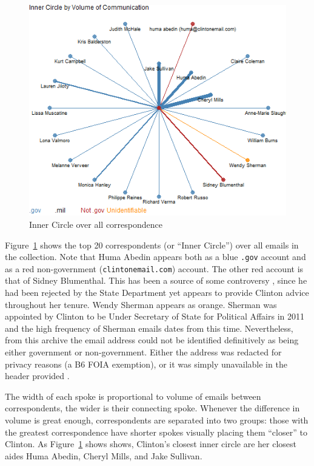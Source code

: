 \documentclass[journal]{vgtc}                %
\begin{document}
\begin{figure}[h]
\begin{center}
\includegraphics[width=0.95\linewidth]{SpiralNetworkFullTime}
\caption{Inner Circle over all correspondence}
\label{fig:InnerCircleAll}
\end{center}
\end{figure}
Figure~\ref{fig:InnerCircleAll} shows the top 20 correspondents (or ``Inner Circle'')  over all emails in the collection.
Note that Huma Abedin appears both as a blue  \texttt{.gov} account and as a red non-government (\texttt{clintonemail.com}) account.   The other red account is that of Sidney Blumenthal.  This has been a source of some controversy  \cite{BlumenthalControversy, NYTBlumenthalBenghazi}, since he had been rejected by the State Department yet appears to provide Clinton advice throughout her tenure.  Wendy Sherman appears as orange. Sherman was appointed by Clinton to be Under Secretary of State for Political Affairs in 2011 and the high frequency of Sherman emails dates from this time.  Nevertheless, from this archive the email address could not be identified definitively as being either government or non-government.  Either the address was redacted for privacy reasons (a B6 FOIA exemption), or it was simply unavailable in the header provided \cite{WikileaksPull}.

The width of each spoke is proportional to volume of emails between correspondents, the wider is their connecting spoke.  Whenever the difference in volume is great enough,  correspondents are separated into two groups: those with the greatest correspondence have shorter spokes visually placing them ``closer'' to Clinton.  As Figure~\ref{fig:InnerCircleAll} shows shows, Clinton's closest inner circle are her closest aides Huma Abedin, Cheryl Mills, and Jake Sullivan.
\end{document}
